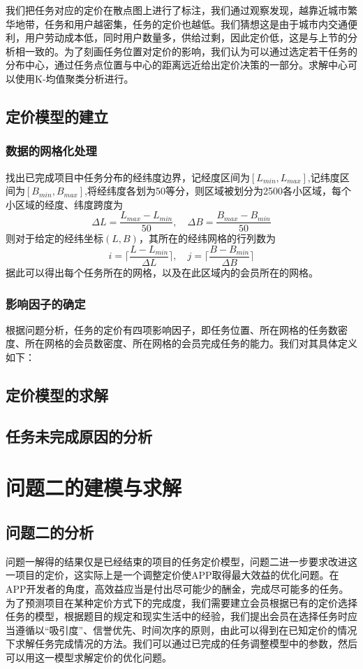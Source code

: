 \documentclass[withoutpreface,bwprint]{cumcmthesis} %
\begin{document}
我们把任务对应的定价在散点图上进行了标注，我们通过观察发现，越靠近城市繁华地带，任务和用户越密集，任务的定价也越低。我们猜想这是由于城市内交通便利，用户劳动成本低，同时用户数量多，供给过剩，因此定价低，这是与上节的分析相一致的。为了刻画任务位置对定价的影响，我们认为可以通过选定若干任务的分布中心，通过任务点位置与中心的距离远近给出定价决策的一部分。求解中心可以使用K-均值聚类分析进行。

\subsection{定价模型的建立}
\subsubsection{数据的网格化处理}
找出已完成项目中任务分布的经纬度边界，记经度区间为$[L_{min},L_{max}]$,记纬度区间为$[B_{min},B_{max}]$,将经纬度各划为50等分，则区域被划分为2500各小区域，每个小区域的经度、纬度跨度为$$\Delta L=\frac{L_{max}-L_{min}}{50},\quad \Delta B=\frac{B_{max}-B_{min}}{50}$$则对于给定的经纬坐标$(L,B)$，其所在的经纬网格的行列数为$$i=\lceil \frac{L-L_{min}}{\Delta L}\rceil,\quad j=\lceil \frac{B-B_{min}}{\Delta B}\rceil$$
据此可以得出每个任务所在的网格，以及在此区域内的会员所在的网格。

\subsubsection{影响因子的确定}
根据问题分析，任务的定价有四项影响因子，即任务位置、所在网格的任务数密度、所在网格的会员数密度、所在网格的会员完成任务的能力。我们对其具体定义如下：

\subsection{定价模型的求解}

\subsection{任务未完成原因的分析}

\section{问题二的建模与求解}
\subsection{问题二的分析}
问题一解得的结果仅是已经结束的项目的任务定价模型，问题二进一步要求改进这一项目的定价，这实际上是一个调整定价使APP取得最大效益的优化问题。在APP开发者的角度，高效益应当是付出尽可能少的酬金，完成尽可能多的任务。为了预测项目在某种定价方式下的完成度，我们需要建立会员根据已有的定价选择任务的模型，根据题目的规定和现实生活中的经验，我们提出会员在选择任务时应当遵循以“吸引度”、信誉优先、时间次序的原则，由此可以得到在已知定价的情况下求解任务完成情况的方法。我们可以通过已完成的任务调整模型中的参数，然后可以用这一模型求解定价的优化问题。
\end{document}

